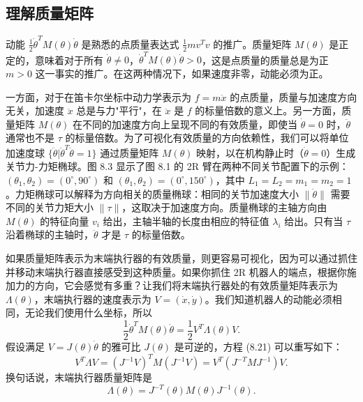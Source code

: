 \documentclass[12pt,a4paper]{article}
\begin{document}
\subsection{理解质量矩阵}

动能 $\frac{1}{2}\dot{\theta}^T M(\theta)\dot{\theta}$ 是熟悉的点质量表达式 $\frac{1}{2}mv^T v$ 的推广。质量矩阵 $M(\theta)$ 是正定的，意味着对于所有 $\dot{\theta} \neq 0$，$\dot{\theta}^T M(\theta)\dot{\theta} > 0$，这是点质量的质量总是为正 $m > 0$ 这一事实的推广。在这两种情况下，如果速度非零，动能必须为正。

一方面，对于在笛卡尔坐标中动力学表示为 $f = m\ddot{x}$ 的点质量，质量与加速度方向无关，加速度 $\ddot{x}$ 总是与力"平行"，在 $\ddot{x}$ 是 $f$ 的标量倍数的意义上。另一方面，质量矩阵 $M(\theta)$ 在不同的加速度方向上呈现不同的有效质量，即使当 $\dot{\theta} = 0$ 时，$\ddot{\theta}$ 通常也不是 $\tau$ 的标量倍数。为了可视化有效质量的方向依赖性，我们可以将单位加速度球 $\{\ddot{\theta} | \ddot{\theta}^T \ddot{\theta} = 1\}$ 通过质量矩阵 $M(\theta)$ 映射，以在机构静止时（$\dot{\theta} = 0$）生成关节力-力矩椭球。图 8.3 显示了图 8.1 的 2R 臂在两种不同关节配置下的示例：$(\theta_1, \theta_2) = (0^\circ, 90^\circ)$ 和 $(\theta_1, \theta_2) = (0^\circ, 150^\circ)$，其中 $L_1 = L_2 = m_1 = m_2 = 1$。力矩椭球可以解释为方向相关的质量椭球：相同的关节加速度大小 $\|\ddot{\theta}\|$ 需要不同的关节力矩大小 $\|\tau\|$，这取决于加速度方向。质量椭球的主轴方向由 $M(\theta)$ 的特征向量 $v_i$ 给出，主轴半轴的长度由相应的特征值 $\lambda_i$ 给出。只有当 $\tau$ 沿着椭球的主轴时，$\ddot{\theta}$ 才是 $\tau$ 的标量倍数。

如果质量矩阵表示为末端执行器的有效质量，则更容易可视化，因为可以通过抓住并移动末端执行器直接感受到这种质量。如果你抓住 2R 机器人的端点，根据你施加力的方向，它会感觉有多重？让我们将末端执行器处的有效质量矩阵表示为 $\Lambda(\theta)$，末端执行器的速度表示为 $V = (\dot{x}, \dot{y})$。我们知道机器人的动能必须相同，无论我们使用什么坐标，所以
\begin{equation}
\frac{1}{2}\dot{\theta}^T M(\theta)\dot{\theta} = \frac{1}{2}V^T \Lambda(\theta)V. \label{eq:8.21}
\end{equation}
假设满足 $V = J(\theta)\dot{\theta}$ 的雅可比 $J(\theta)$ 是可逆的，方程 (8.21) 可以重写如下：
\begin{equation}
V^T \Lambda V = (J^{-1}V)^T M(J^{-1}V) = V^T(J^{-T}MJ^{-1})V.
\end{equation}
换句话说，末端执行器质量矩阵是
\begin{equation}
\Lambda(\theta) = J^{-T}(\theta)M(\theta)J^{-1}(\theta). \label{eq:8.22}
\end{equation}
\end{document}
